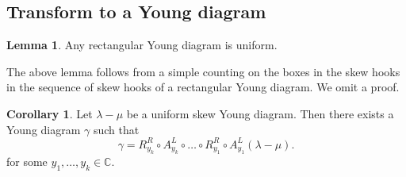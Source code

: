 \documentclass[11pt]{amsart}
\numberwithin{equation}{section}
\theoremstyle{definition}
\newtheorem{lemma}[thm]{Lemma}
\newtheorem{corollary}[thm]{Corollary}
\newtheorem{definition}[thm]{Definition}
\begin{document}






\subsection{Transform to a Young diagram}

\begin{lemma} \label{lem young diag connected}
Any rectangular Young diagram is uniform.
\end{lemma}

The above lemma follows from a simple counting on the boxes in the skew hooks in the sequence of skew hooks of a rectangular Young diagram. We omit a proof.


\begin{corollary} \label{cor skew yound to young diagram}
Let $\lambda-\mu$ be a uniform skew Young diagram. Then there exists a Young diagram $\gamma$ such that 
\[  \gamma = R^R_{y_k}\circ A^L_{y_k}\circ \ldots  \circ R^R_{y_1} \circ  A^L_{y_1}(\lambda-\mu) .
\]
for some $y_1, \ldots, y_k \in \mathbb C$.
\end{corollary}
\end{document}
